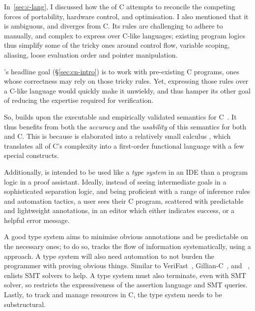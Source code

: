 In~\cref{sec:c-lang}, I discussed how the  of C attempts to
reconcile the competing forces of portability, hardware control, and
optimisation. I also mentioned that it is ambiguous, and diverges from  C. Its rules are challenging to adhere to manually, and complex to
express over C-like languages; existing program logics thus simplify some of
the tricky ones around control flow, variable scoping, aliasing, loose
evaluation order and pointer manipulation.

's headline goal (\S\ref{sec:cn-intro}) is to work with pre-existing C
programs, ones whose correctness may rely on those tricky rules. Yet,
expressing those rules over a C-like language would quickly make it unwieldy,
and thus hamper its other goal of reducing the expertise required for
verification.

So,  builds upon the  executable and empirically validated
semantics for C~. It thus benefits from both the
\emph{accuracy} and the \emph{usability} of this semantics for both 
and  C. This is because  is elaborated into a
relatively small calculus \emph{}, which translates all of C's
complexity into a first-order functional language with a few special
constructs.

Additionally,  is intended to be used like a \emph{type system} in an
IDE than a program logic in a proof assistant. Ideally, instead of seeing
intermediate goals in a sophisticated separation logic, and being proficient
with a range of inference rules and automation tactics, a user sees their C
program, scattered with predictable and lightweight annotations, in an editor
which either indicates success, or a helpful error message.

%

A good type system aims to minimise obvious annotations and be predictable on
the necessary ones; to do so,  tracks the flow of information
systematically, using a  approach. A type system will also
need automation to not burden the programmer with proving obvious things.
Similar to VeriFast~,
Gillian-C~, and
~,  enlists SMT solvers to help. A
type system must also terminate, even with SMT solver, so  restricts the
expressiveness of the assertion language and SMT queries. Lastly, to track and
manage resources in C, the type system needs to be substructural.


